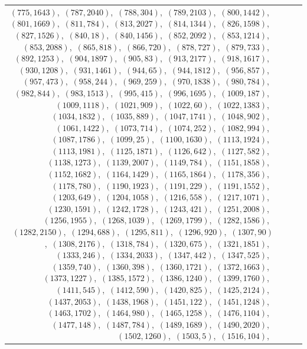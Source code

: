 \documentclass[11pt]{article}
\begin{document}
\begin{longtable}{@{}rrl>{\raggedright\arraybackslash}p{}@{}}
$(775,1643)$,\allowbreak\ $(787,2040)$,\allowbreak\ $(788,304)$,\allowbreak\ $(789,2103)$,\allowbreak\ $(800,1442)$,\allowbreak\ $(801,1669)$,\allowbreak\ $(811,784)$,\allowbreak\ $(813,2027)$,\allowbreak\ $(814,1344)$,\allowbreak\ $(826,1598)$,\allowbreak\ $(827,1526)$,\allowbreak\ $(840,18)$,\allowbreak\ $(840,1456)$,\allowbreak\ $(852,2092)$,\allowbreak\ $(853,1214)$,\allowbreak\ $(853,2088)$,\allowbreak\ $(865,818)$,\allowbreak\ $(866,720)$,\allowbreak\ $(878,727)$,\allowbreak\ $(879,733)$,\allowbreak\ $(892,1253)$,\allowbreak\ $(904,1897)$,\allowbreak\ $(905,83)$,\allowbreak\ $(913,2177)$,\allowbreak\ $(918,1617)$,\allowbreak\ $(930,1208)$,\allowbreak\ $(931,1461)$,\allowbreak\ $(944,65)$,\allowbreak\ $(944,1812)$,\allowbreak\ $(956,857)$,\allowbreak\ $(957,473)$,\allowbreak\ $(958,244)$,\allowbreak\ $(969,259)$,\allowbreak\ $(970,1838)$,\allowbreak\ $(980,784)$,\allowbreak\ $(982,844)$,\allowbreak\ $(983,1513)$,\allowbreak\ $(995,415)$,\allowbreak\ $(996,1695)$,\allowbreak\ $(1009,187)$,\allowbreak\ $(1009,1118)$,\allowbreak\ $(1021,909)$,\allowbreak\ $(1022,60)$,\allowbreak\ $(1022,1383)$,\allowbreak\ $(1034,1832)$,\allowbreak\ $(1035,889)$,\allowbreak\ $(1047,1741)$,\allowbreak\ $(1048,902)$,\allowbreak\ $(1061,1422)$,\allowbreak\ $(1073,714)$,\allowbreak\ $(1074,252)$,\allowbreak\ $(1082,994)$,\allowbreak\ $(1087,1786)$,\allowbreak\ $(1099,25)$,\allowbreak\ $(1100,1630)$,\allowbreak\ $(1113,1924)$,\allowbreak\ $(1113,1981)$,\allowbreak\ $(1125,1871)$,\allowbreak\ $(1126,642)$,\allowbreak\ $(1127,582)$,\allowbreak\ $(1138,1273)$,\allowbreak\ $(1139,2007)$,\allowbreak\ $(1149,784)$,\allowbreak\ $(1151,1858)$,\allowbreak\ $(1152,1682)$,\allowbreak\ $(1164,1429)$,\allowbreak\ $(1165,1864)$,\allowbreak\ $(1178,356)$,\allowbreak\ $(1178,780)$,\allowbreak\ $(1190,1923)$,\allowbreak\ $(1191,229)$,\allowbreak\ $(1191,1552)$,\allowbreak\ $(1203,649)$,\allowbreak\ $(1204,1058)$,\allowbreak\ $(1216,558)$,\allowbreak\ $(1217,1071)$,\allowbreak\ $(1230,1591)$,\allowbreak\ $(1242,1728)$,\allowbreak\ $(1243,421)$,\allowbreak\ $(1251,2008)$,\allowbreak\ $(1256,1955)$,\allowbreak\ $(1268,1039)$,\allowbreak\ $(1269,1799)$,\allowbreak\ $(1282,1586)$,\allowbreak\ $(1282,2150)$,\allowbreak\ $(1294,688)$,\allowbreak\ $(1295,811)$,\allowbreak\ $(1296,920)$,\allowbreak\ $(1307,90)$,\allowbreak\ $(1308,2176)$,\allowbreak\ $(1318,784)$,\allowbreak\ $(1320,675)$,\allowbreak\ $(1321,1851)$,\allowbreak\ $(1333,246)$,\allowbreak\ $(1334,2033)$,\allowbreak\ $(1347,442)$,\allowbreak\ $(1347,525)$,\allowbreak\ $(1359,740)$,\allowbreak\ $(1360,398)$,\allowbreak\ $(1360,1721)$,\allowbreak\ $(1372,1663)$,\allowbreak\ $(1373,1227)$,\allowbreak\ $(1385,1572)$,\allowbreak\ $(1386,1240)$,\allowbreak\ $(1399,1760)$,\allowbreak\ $(1411,545)$,\allowbreak\ $(1412,590)$,\allowbreak\ $(1420,825)$,\allowbreak\ $(1425,2124)$,\allowbreak\ $(1437,2053)$,\allowbreak\ $(1438,1968)$,\allowbreak\ $(1451,122)$,\allowbreak\ $(1451,1248)$,\allowbreak\ $(1463,1702)$,\allowbreak\ $(1464,980)$,\allowbreak\ $(1465,1258)$,\allowbreak\ $(1476,1104)$,\allowbreak\ $(1477,148)$,\allowbreak\ $(1487,784)$,\allowbreak\ $(1489,1689)$,\allowbreak\ $(1490,2020)$,\allowbreak\ $(1502,1260)$,\allowbreak\ $(1503,5)$,\allowbreak\ $(1516,104)$,\allowbreak\ 
\end{longtable}
\end{document}
